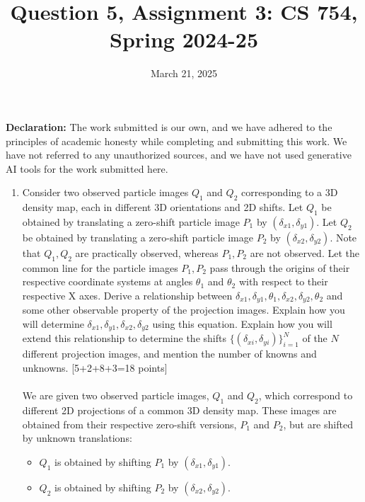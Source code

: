 \documentclass{article}
\title{Question 5, Assignment 3: CS 754, Spring 2024-25}
\author{
\IEEEauthorblockN{
    \begin{tabular}{cccc}
        \begin{minipage}[t]{0.23\textwidth}
            \centering
            Amitesh Shekhar\\
            IIT Bombay\\
            22b0014@iitb.ac.in
        \end{minipage} & 
        \begin{minipage}[t]{0.23\textwidth}
            \centering
            Anupam Rawat\\
            IIT Bombay\\
            22b3982@iitb.ac.in
        \end{minipage} & 
        \begin{minipage}[t]{0.23\textwidth}
            \centering
            Toshan Achintya Golla\\
            IIT Bombay\\
            22b2234@iitb.ac.in
        \end{minipage} \\
        \\ 
    \end{tabular}
}
}
\date{March 21, 2025}
\begin{document}
\maketitle

\textbf{Declaration:} The work submitted is our own, and
we have adhered to the principles of academic honesty while completing and submitting this work. We have not
referred to any unauthorized sources, and we have not used generative AI tools for the work submitted here.

\begin{enumerate}
\item Consider two observed particle images $Q_1$ and $Q_2$ corresponding to a 3D density map, each in different 3D orientations and 2D shifts. Let $Q_1$ be obtained by translating a zero-shift particle image $P_1$ by $(\delta_{x1},\delta_{y1})$.  Let $Q_2$ be obtained by translating a zero-shift particle image $P_2$ by $(\delta_{x2},\delta_{y2})$. Note that $Q_1, Q_2$ are practically observed, whereas $P_1, P_2$ are not observed. Let the common line for the particle images $P_1, P_2$ pass through the origins of their respective coordinate systems at angles $\theta_1$ and $\theta_2$ with respect to their respective X axes. Derive a relationship between $\delta_{x1},\delta_{y1}, \theta_1, \delta_{x2},\delta_{y2}, \theta_2$ and some other observable property of the projection images. Explain how you will determine $\delta_{x1}, \delta_{y1}, \delta_{x2}, \delta_{y2}$ using this equation. Explain how you will extend this relationship to determine the shifts $\{(\delta_{xi},\delta_{yi})\}_{i=1}^N$ of the $N$ different projection images, and mention the number of knowns and unknowns. \textsf{[5+2+8+3=18 points]}
\\
\\
We are given two observed particle images, $Q_1$ and $Q_2$, which correspond to different 2D projections of a common 3D density map. These images are obtained from their respective zero-shift versions, $P_1$ and $P_2$, but are shifted by unknown translations:
\begin{itemize}
    \item $Q_1$ is obtained by shifting $P_1$ by $(\delta_{x1}, \delta_{y1})$.
    \item $Q_2$ is obtained by shifting $P_2$ by $(\delta_{x2}, \delta_{y2})$.
\end{itemize}


\end{enumerate}
\end{document}
